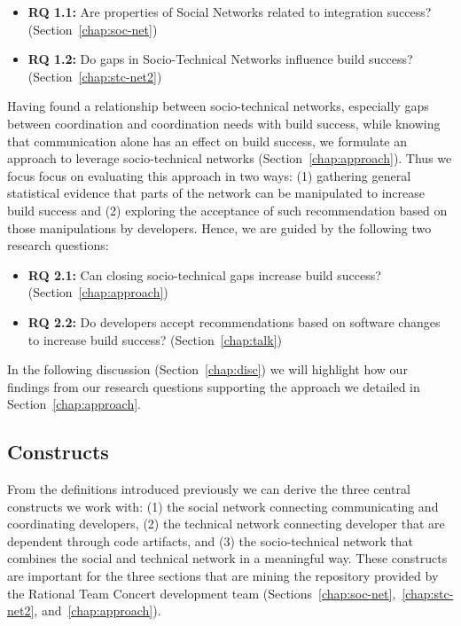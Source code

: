 \begin{itemize}
  \item\textbf{RQ 1.1:} Are properties of Social Networks related to integration success? (Section~\ref{chap:soc-net})
  \item\textbf{RQ 1.2:} Do gaps in Socio-Technical Networks influence build success? (Section~\ref{chap:stc-net2})
\end{itemize}

Having found a relationship between socio-technical networks, especially gaps between coordination and coordination needs with build success, while knowing that communication alone has an effect on build success, we formulate an approach to leverage socio-technical networks (Section~\ref{chap:approach}).
Thus we focus focus on evaluating this approach in two ways:
(1) gathering general statistical evidence that parts of the network can be manipulated to increase build success and
(2) exploring the acceptance of such recommendation based on those manipulations by developers.
Hence, we are guided by the following two research questions:

\begin{itemize}
  \item\textbf{RQ 2.1:} Can closing socio-technical gaps increase build success? (Section~\ref{chap:approach})
  \item\textbf{RQ 2.2:} Do developers accept recommendations based on software changes to increase build success? (Section~\ref{chap:talk})
\end{itemize}

In the following discussion (Section~\ref{chap:disc}) we will highlight how our findings from our research questions supporting the approach we detailed in Section~\ref{chap:approach}.





\subsection{Constructs}
\label{c5:sec:constructs}
From the definitions introduced previously we can derive the three central constructs we work with: (1) the social network connecting communicating and coordinating developers, (2) the technical network connecting developer that are dependent through code artifacts, and (3) the socio-technical network that combines the social and technical network in a meaningful way.
These constructs are important for the three sections that are mining the repository provided by the Rational Team Concert development team (Sections~\ref{chap:soc-net},~\ref{chap:stc-net2}, and~\ref{chap:approach}).

